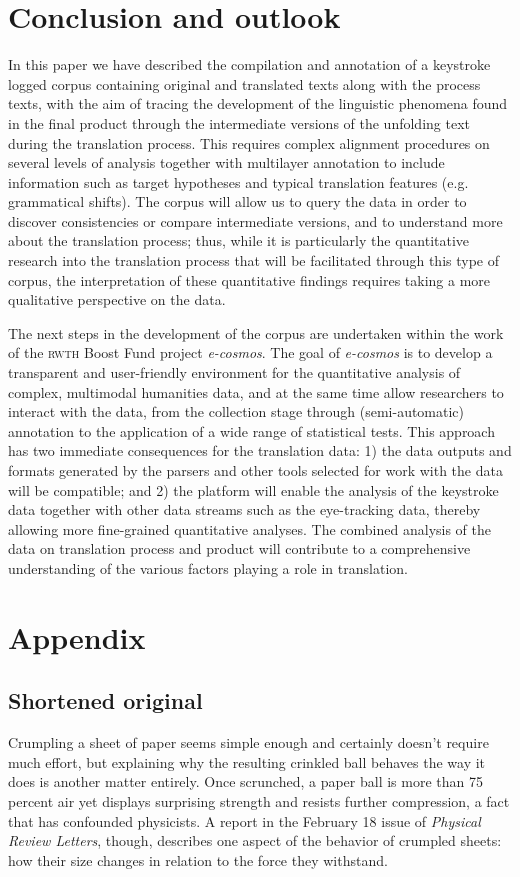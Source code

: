 \documentclass[output=paper]{LSP/langsci}
\begin{document}
\section{Conclusion and outlook} \label{sec:1:4}
In this paper we have described the compilation and annotation of a keystroke logged corpus containing original and translated texts along with the process texts, with the aim of tracing the development of the linguistic phenomena found in the final product through the intermediate versions of the unfolding text during the translation process. This requires complex alignment procedures on several levels of analysis together with multilayer annotation to include information such as target hypotheses and typical translation features (e.g. grammatical shifts). The corpus will allow us to query the data in order to discover consistencies or compare intermediate versions, and to understand more about the translation process; thus, while it is particularly the quantitative research into the translation process that will be facilitated through this type of corpus, the interpretation of these quantitative findings requires taking a more qualitative perspective on the data.

The next steps in the development of the corpus are undertaken within the work of the \textsc{rwth} Boost Fund project \textit{e-cosmos}. The goal of \textit{e-cosmos} is to develop a transparent and user-friendly environment for the quantitative analysis of complex, multimodal humanities data, and at the same time allow researchers to interact with the data, from the collection stage through (semi-automatic) annotation to the application of a wide range of statistical tests. This approach has two immediate consequences for the translation data: 1) the data outputs and formats generated by the parsers and other tools selected for work with the data will be compatible; and 2) the platform will enable the analysis of the keystroke data together with other data streams such as the eye-tracking data, thereby allowing more fine-grained quantitative analyses. The combined analysis of the data on translation process and product will contribute to a comprehensive understanding of the various factors playing a role in translation.  


\section*{Appendix}

\subsection*{Shortened original}
Crumpling a sheet of paper seems simple enough and certainly doesn't require much effort, but explaining why the resulting crinkled ball behaves the way it does is another matter entirely. Once scrunched, a paper ball is more than 75 percent air yet displays surprising strength and resists further compression, a fact that has confounded physicists. A report in the February 18 issue of \textit{Physical Review Letters}, though, describes one aspect of the behavior of crumpled sheets: how their size changes in relation to the force they withstand.
 
\end{document}
